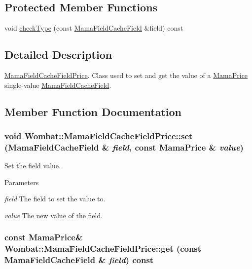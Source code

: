 \subsection*{Protected Member Functions}
\begin{DoxyCompactItemize}
\item 
void \hyperlink{classWombat_1_1MamaFieldCacheFieldPrice_a6f7841874b57b8cdb68ebe09ff1d44b9}{checkType} (const \hyperlink{classWombat_1_1MamaFieldCacheField}{MamaFieldCacheField} \&field) const 
\end{DoxyCompactItemize}


\subsection{Detailed Description}
\hyperlink{classWombat_1_1MamaFieldCacheFieldPrice}{MamaFieldCacheFieldPrice}. Class used to set and get the value of a \hyperlink{classWombat_1_1MamaPrice}{MamaPrice} single-\/value {\ttfamily \hyperlink{classWombat_1_1MamaFieldCacheField}{MamaFieldCacheField}}. 

\subsection{Member Function Documentation}
\hypertarget{classWombat_1_1MamaFieldCacheFieldPrice_a74e6b0899fdf9a2ed77acd16861f37f8}{
\subsubsection[{set}]{\setlength{\rightskip}{0pt plus 5cm}void Wombat::MamaFieldCacheFieldPrice::set ({\bf MamaFieldCacheField} \& {\em field}, \/  const {\bf MamaPrice} \& {\em value})}}
\label{classWombat_1_1MamaFieldCacheFieldPrice_a74e6b0899fdf9a2ed77acd16861f37f8}


Set the field value. 
\begin{DoxyParams}{Parameters}
\item[{\em field}]The field to set the value to. \item[{\em value}]The new value of the field. \end{DoxyParams}
\hypertarget{classWombat_1_1MamaFieldCacheFieldPrice_ac49df5226c0b14c2cfd24d827c324248}{
\subsubsection[{get}]{\setlength{\rightskip}{0pt plus 5cm}const {\bf MamaPrice}\& Wombat::MamaFieldCacheFieldPrice::get (const {\bf MamaFieldCacheField} \& {\em field}) const}}
\label{classWombat_1_1MamaFieldCacheFieldPrice_ac49df5226c0b14c2cfd24d827c324248}


